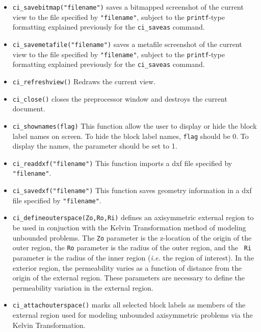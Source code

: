 \begin{itemize}
\item \texttt{ci\_savebitmap("filename")} saves a bitmapped screenshot of the current
view to the file specified by \texttt{"filename"}, subject to the
\texttt{printf}-type formatting explained previously for the
\texttt{ci\_saveas} command.

\item \texttt{ci\_savemetafile("filename")} saves a metafile screenshot of the current
view to the file specified by \texttt{"filename"}, subject to the
\texttt{printf}-type formatting explained previously for the
\texttt{ci\_saveas} command.

\item \texttt{ci\_refreshview()} Redraws the current view.

\item \texttt{ci\_close()} closes the preprocessor window and
destroys the current document.

\item \texttt{ci\_shownames(flag)} This function allow the user to display or hide the
block label names on screen. To hide the block label names,
\texttt{flag} should be 0. To display the names, the parameter
should be set to 1.

\item{\tt ci\_readdxf("filename")} This function imports a dxf file specified by {\tt "filename"}.

\item{\tt ci\_savedxf("filename")} This function saves geometry information in a dxf file specified by {\tt "filename"}.

\item{\tt ci\_defineouterspace(Zo,Ro,Ri)} defines
an axisymmetric external region to be used in conjuction with the
Kelvin Transformation method of modeling unbounded problems.  The
{\tt Zo} parameter is the z-location of the origin of the outer region,
the {\tt Ro} parameter is the radius of the outer region, and the {\tt
Ri} parameter is the radius of the inner region ({\em i.e.} the region of
interest). In the exterior region, the permeability varies as a function of
distance from the origin of the external region.  These parameters
are necessary to define the permeability variation in the external
region.

\item{\tt ci\_attachouterspace()} marks all
selected block labels as members of the external region used for
modeling unbounded axisymmetric problems via the Kelvin
Transformation.


\end{itemize}
